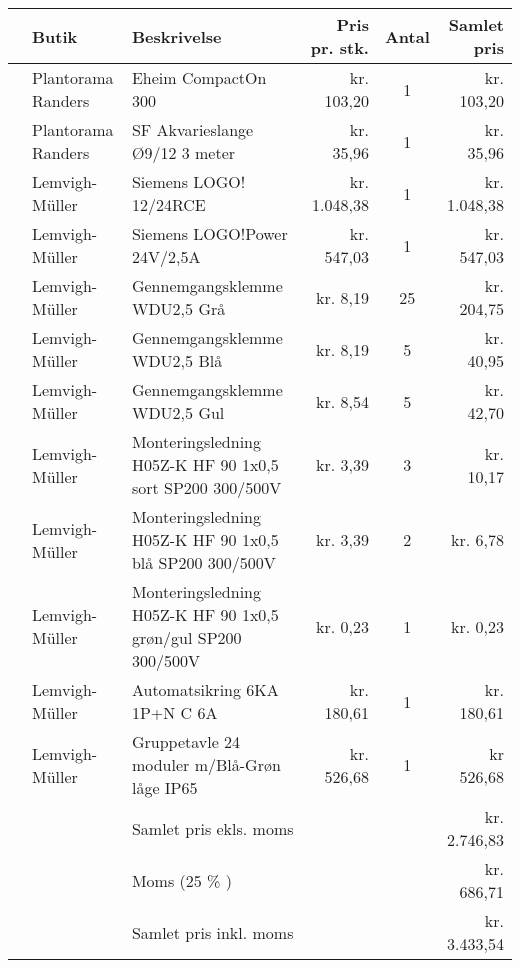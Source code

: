 \documentclass[12pt,a4paper,twoside,landscape]{article}
\begin{document}
\begin{tabular}[c]{|l|l|l|r|c|r|}
    \hline
    & Butik & Beskrivelse & Pris pr. stk. & Antal & Samlet pris \\
    \hline \hline
    \parbox[t]{2mm}{}& Plantorama Randers & Eheim CompactOn 300 &  kr. 103,20 & 1 & kr. 103,20 \\
    & Plantorama Randers & SF Akvarieslange Ø9/12 3 meter & kr. 35,96 & 1 & kr. 35,96 \\
    & Lemvigh-Müller & Siemens LOGO! 12/24RCE & kr. 1.048,38 & 1 & kr. 1.048,38 \\
    & Lemvigh-Müller & Siemens LOGO!Power 24V/2,5A &  kr. 547,03 & 1 & kr. 547,03 \\
    & Lemvigh-Müller & Gennemgangsklemme WDU2,5 Grå & kr. 8,19 & 25 & kr. 204,75 \\
    & Lemvigh-Müller & Gennemgangsklemme WDU2,5 Blå & kr. 8,19 & 5 & kr. 40,95 \\
    & Lemvigh-Müller & Gennemgangsklemme WDU2,5 Gul & kr. 8,54 & 5 & kr. 42,70 \\
    & Lemvigh-Müller & Monteringsledning H05Z-K HF 90 1x0,5 sort SP200 300/500V & kr. 3,39 & 3 & kr. 10,17 \\
    & Lemvigh-Müller & Monteringsledning H05Z-K HF 90 1x0,5 blå SP200 300/500V & kr. 3,39 & 2 & kr. 6,78 \\
    & Lemvigh-Müller & Monteringsledning H05Z-K HF 90 1x0,5 grøn/gul SP200 300/500V & kr. 0,23 & 1 & kr. 0,23 \\
    & Lemvigh-Müller & Automatsikring 6KA 1P+N C 6A & kr. 180,61 & 1 & kr. 180,61 \\
    & Lemvigh-Müller & Gruppetavle 24 moduler m/Blå-Grøn låge IP65 & kr. 526,68 & 1 & kr 526,68 \\
    \hline 
    &                 & Samlet pris ekls. moms &  & & kr. 2.746,83 \\
    &                 & Moms (25 \% ) & & & kr. 686,71 \\
    &                 & Samlet pris inkl. moms & & & kr. 3.433,54 \\
                    \hline

\end{tabular}
\end{document}
